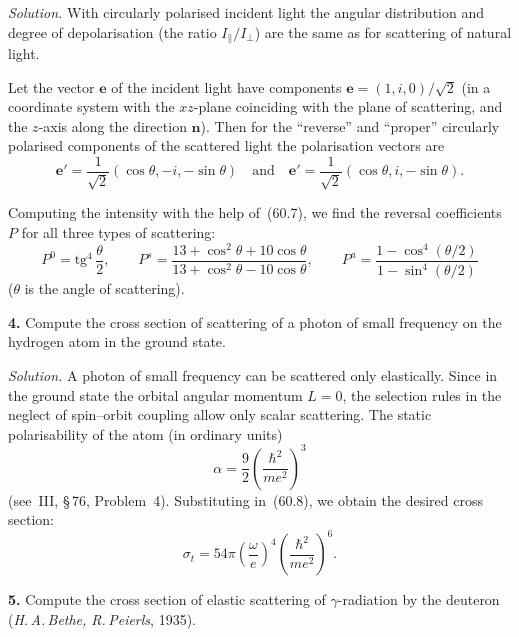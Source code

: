 \textit{Solution.} With circularly polarised incident light the angular distribution and degree of depolarisation (the ratio $I_\parallel/I_\perp$) are the same as for scattering of natural light.

Let the vector $\mathbf{e}$ of the incident light have components $\mathbf{e} = (1, i, 0)/\sqrt{2}$ (in a coordinate system with the $xz$-plane coinciding with the plane of scattering, and the $z$-axis along the direction $\mathbf{n}$). Then for the ``reverse'' and ``proper'' circularly polarised components of the scattered light the polarisation vectors are
\[
\mathbf{e}' = \frac{1}{\sqrt{2}}(\cos\theta, -i, -\sin\theta)\quad\text{and}\quad \mathbf{e}' = \frac{1}{\sqrt{2}}(\cos\theta, i, -\sin\theta).
\]

Computing the intensity with the help of~(60.7), we find the reversal coefficients $P$ for all three types of scattering:
\[
P^0 = \mathrm{tg}^4\,\frac{\theta}{2},\qquad P^s = \frac{13 + \cos^2\theta + 10\cos\theta}{13 + \cos^2\theta - 10\cos\theta},\qquad P^a = \frac{1 - \cos^4(\theta/2)}{1 - \sin^4(\theta/2)}
\]
($\theta$ is the angle of scattering).

\textbf{4.} Compute the cross section of scattering of a photon of small frequency on the hydrogen atom in the ground state.

\textit{Solution.} A photon of small frequency can be scattered only elastically. Since in the ground state the orbital angular momentum $L = 0$, the selection rules in the neglect of spin--orbit coupling allow only scalar scattering. The static polarisability of the atom (in ordinary units)
\[
\alpha = \frac{9}{2}\left(\frac{\hbar^2}{me^2}\right)^{\!3}
\]
(see~III, \S\,76, Problem~4). Substituting in~(60.8), we obtain the desired cross section:
\[
\sigma_t = 54\pi\left(\frac{\omega}{e}\right)^{\!4}\left(\frac{\hbar^2}{me^2}\right)^{\!6}.
\]

\textbf{5.} Compute the cross section of elastic scattering of $\gamma$-radiation by the deuteron (\textit{H.\,A.\,Bethe, R.\,Peierls}, 1935).


